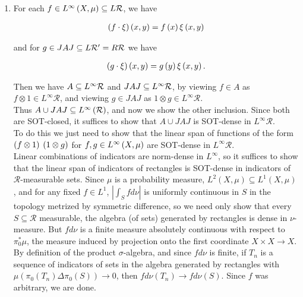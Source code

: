 \documentclass[a4paper,10pt]{report}
\begin{document}
\begin{enumerate}
              \item For each $f \in L^\infty \left( X , \mu \right) \subseteq L \mathcal R$, we have

                \begin{align*}
                  \left( f \cdot \xi \right) \left( x , y \right) = f \left( x \right) \xi \left( x , y \right)
                \end{align*}

                and for $g \in J A J \subseteq L \mathcal R' = R \mathcal R$ we have

                \begin{align*}
                  \left( g \cdot \xi \right) \left( x , y \right) = g \left( y \right) \xi \left( x , y \right).
                \end{align*}

                Then we have $A \subseteq L^\infty \mathcal R$ and $J A J \subseteq L^\infty \mathcal R$, by viewing $f \in A$ as $f \otimes 1 \in L^\infty \mathcal R$, and viewing $g \in J A J$ as $1 \otimes g \in L^\infty \mathcal R$.\\
                Thus $A \cup J A J \subseteq L^\infty \left( \mathcal R \right)$, and now we show the other inclusion. Since both are SOT-closed, it suffices to show that $A \cup J A J$ is SOT-dense in $L^\infty \mathcal R$.\\
                To do this we just need to show that the linear span of functions of the form $\left( f \otimes 1 \right)$ $\left( 1 \otimes g \right)$ for $f , g \in L^\infty \left( X , \mu \right)$ are SOT-dense in $L^\infty \mathcal R$.\\
                Linear combinations of indicators are norm-dense in $L^\infty$, so it suffices to show that the linear span of indicators of rectangles is SOT-dense in indicators of $\mathcal R$-measurable sets. 
																Since $\mu$ is a probability measure, $L^2(X,\mu)\subseteq L^1(X,\mu)$, and for any fixed $f\in L^1$, $|\int_{S}fd\nu|$ is uniformly continuous in $S$ in the topology metrized by symmetric difference, so we need only show that every $S\subseteq\mathcal{R}$ measurable, the algebra (of sets) generated by rectangles is dense in $\nu$-measure. But $fd\nu$ is a finite measure absolutely continuous with respect to $\pi_0^*\mu$, the measure induced by projection onto the first coordinate $X\times X\to X$. By definition of the product $\sigma$-algebra, and since $fd\nu$ is finite, if $T_n$ is a sequence of indicators of sets in the algebra generated by rectangles with $\mu(\pi_0(T_n)\Delta\pi_0(S))\to 0$, then $fd\nu(T_n)\to fd\nu(S)$. Since $f$ was arbitrary, we are done. 
\end{enumerate}
\end{document}

